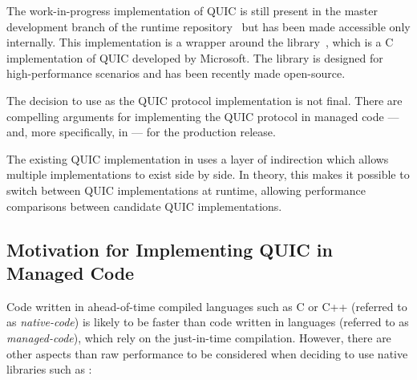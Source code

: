 The work-in-progress implementation of QUIC is still present in the master development branch of the
\dotnet{} runtime repository~\cite{dotnetGithub} but has been made accessible only internally. This
implementation is a wrapper around the \libmsquic{} library~\cite{msquicGithub}, which is a C
implementation of QUIC developed by Microsoft. The \libmsquic{} library is designed for
high-performance scenarios and has been recently made open-source.

The decision to use \libmsquic{} as the QUIC protocol implementation is not final. There are
compelling arguments for implementing the QUIC protocol in managed \dotnet{} code --- and, more
specifically, in \csharp{} --- for the production release.

The existing QUIC implementation in \dotnet{} uses a layer of indirection which allows multiple
implementations to exist side by side. In theory, this makes it possible to switch between QUIC
implementations at runtime, allowing performance comparisons between candidate QUIC implementations.

\subsection*{Motivation for Implementing QUIC in Managed Code}

Code written in ahead-of-time compiled languages such as C or C++ (referred to as
\textit{\gls{native-code}}) is likely to be faster than code written in \dotnet{} languages
(referred to as \textit{\gls{managed-code}}), which rely on the just-in-time compilation. However,
there are other aspects than raw performance to be considered when deciding to use native libraries
such as \libmsquic{}:

